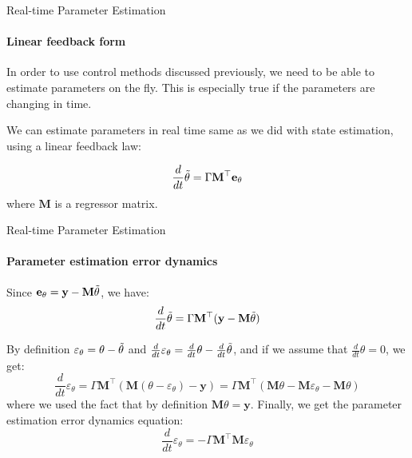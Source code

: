 \documentclass{beamer}
\begin{document}
\begin{frame}{Real-time Parameter Estimation}
\framesubtitle{Linear feedback form}
\begin{flushleft}

In order to use control methods discussed previously, we need to be able to estimate parameters on the fly. This is especially true if the parameters are changing in time.

We can estimate parameters in real time same as we did with state estimation, using a linear feedback law:

\[
\frac{d}{dt}\Tilde{\theta} = \Gamma \mathbf M^\top \mathbf e_{\theta}
\]
%
where $\mathbf M$ is a regressor matrix. 

\end{flushleft}
\end{frame}



\begin{frame}{Real-time Parameter Estimation}
\framesubtitle{Parameter estimation error dynamics}
\begin{flushleft}

Since $\mathbf e_{\theta} = \mathbf y - \mathbf M \Tilde{\theta}$, we have:
%
\[
\frac{d}{dt}\Tilde{\theta} = \Gamma \mathbf M^\top (\mathbf y - \mathbf M \Tilde{\theta})
\]

By definition $\varepsilon_{\theta} = \theta - \Tilde{\theta}$ and $\frac{d}{dt}\varepsilon_{\theta} = \frac{d}{dt}\theta - \frac{d}{dt}\Tilde{\theta}$, and if we assume that $\frac{d}{dt}\theta = 0$, we get:
%
\[
\frac{d}{dt}\varepsilon_{\theta} = \Gamma \mathbf M^\top (\mathbf M (\theta - \varepsilon_{\theta}) - \mathbf y)
= \Gamma \mathbf M^\top (\mathbf M \theta - \mathbf M \varepsilon_{\theta} - \mathbf M \theta)
\]
%
where we used the fact that by definition $\mathbf M \theta = \mathbf y$. Finally, we get the parameter estimation error dynamics equation:
%
\[
\frac{d}{dt}\varepsilon_{\theta}
= - \Gamma \mathbf M^\top \mathbf M \varepsilon_{\theta}
\]

\end{flushleft}
\end{frame}
\end{document}
